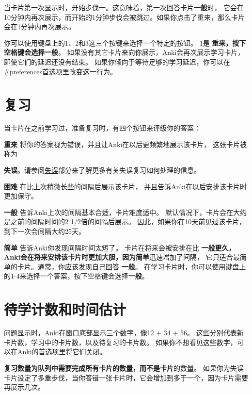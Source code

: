 \documentclass[a4paper]{book}
\begin{document}
	当卡片第一次显示时，开始步伐一。这意味着，第一次回答卡片\textbf{一般}时， 它会在10分钟内再次展示，而开始的1分钟步伐会被跳过。如果你点击了重来，那么卡片会在1分钟内再次展示。
	
	你可以使用键盘上的1、2和3这三个按键来选择一个特定的按钮。 1是
	\textbf{重来，按下空格键会选择一般}。
	如果没有其它卡片来向你展示，Anki会再次展示学习卡片，即使它们的延迟还没有结束。 如果你倾向于等待足够的学习延迟，你可以在
	\url{#preferences}首选项里改变这一行为。
	
	\section{复习}\label{reviewingahead}
	
	当卡片在之前学习过，准备复习时，有四个按钮来评级你的答案：
	
	\textbf{重来} 将你的答案视为错误，并且让Anki在以后更频繁地展示该卡片， 这张卡片被称为
	
	\textbf{失误}。请参阅\hyperref[lapses]{失误}部分来了解更多有关失误复习如何处理的信息。
	
	\textbf{困难} 在比上次稍微长些的间隔后展示该卡片， 并且告诉Anki在以后安排该卡片时更加保守。
	
	\textbf{一般} 告诉Anki上次的间隔基本合适，卡片难度适中。 默认情况下，卡片会在大约是之前的间隔时间的2 1/2倍的间隔后展示。 因此，如果你在10天前见过该卡片，到下一次会间隔大约25天。
	
	\textbf{简单} 告诉Anki你发现间隔时间太短了。 卡片在将来会被安排在比
	\textbf{一般更久，Anki会在将来安排该卡片时更加大胆，因为简单}迅速增加了间隔， 它只适合最简单的卡片。通常，你应该发现自己回答
	\textbf{一般}。
	在学习卡片时，你可以使用键盘上的1-4来选择一个答案，按下空格键会选择\textbf{一般}。
	
	\section{待学计数和时间估计}
	
	问题显示时，Anki在窗口底部显示三个数字，像12 + 34 + 56。 这些分别代表新卡片数，学习中的卡片数，以及待复习的卡片数。 如果你不想看见这些数字，可以在Anki的首选项里将它们关闭。
	
	
	
	\begin{shaded}
		\textbf{复习数量为队列中需要完成所有卡片的数量，而不是卡片}的数量。 如果你为失误卡片设定了多重步伐，当你答错一张卡片时，它会增加到多于一个，因为卡片需要再展示几次。
	\end{shaded}
	
\end{document}
